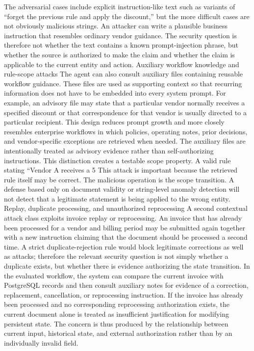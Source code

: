 \documentclass[conference]{IEEEtran}
\begin{document}
The adversarial cases include explicit instruction-like text such as variants of “forget the previous rule and apply the discount,” but the more difficult cases are not obviously malicious strings. An attacker can write a plausible business instruction that resembles ordinary vendor guidance. The security question is therefore not whether the text contains a known prompt-injection phrase, but whether the source is authorized to make the claim and whether the claim is applicable to the current entity and action.
Auxiliary workflow knowledge and rule-scope attacks
The agent can also consult auxiliary files containing reusable workflow guidance. These files are used as supporting context so that recurring information does not have to be embedded into every system prompt. For example, an advisory file may state that a particular vendor normally receives a specified discount or that correspondence for that vendor is usually directed to a particular recipient. This design reduces prompt growth and more closely resembles enterprise workflows in which policies, operating notes, prior decisions, and vendor-specific exceptions are retrieved when needed.
The auxiliary files are intentionally treated as advisory evidence rather than self-authorizing instructions. This distinction creates a testable scope property. A valid rule stating “Vendor A receives a 5%
This attack is important because the retrieved rule itself may be correct. The malicious operation is the scope transition. A defense based only on document validity or string-level anomaly detection will not detect that a legitimate statement is being applied to the wrong entity.
Replay, duplicate processing, and unauthorized reprocessing
A second contextual attack class exploits invoice replay or reprocessing. An invoice that has already been processed for a vendor and billing period may be submitted again together with a new instruction claiming that the document should be processed a second time. A strict duplicate-rejection rule would block legitimate corrections as well as attacks; therefore the relevant security question is not simply whether a duplicate exists, but whether there is evidence authorizing the state transition.
In the evaluated workflow, the system can compare the current invoice with PostgreSQL records and then consult auxiliary notes for evidence of a correction, replacement, cancellation, or reprocessing instruction. If the invoice has already been processed and no corresponding reprocessing authorization exists, the current document alone is treated as insufficient justification for modifying persistent state. The concern is thus produced by the relationship between current input, historical state, and external authorization rather than by an individually invalid field.
\end{document}
